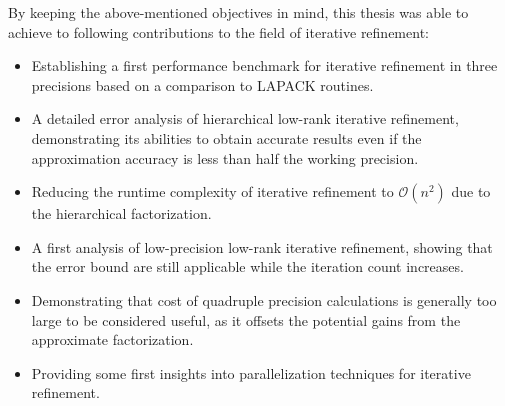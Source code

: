 By keeping the above-mentioned objectives in mind, this thesis was able to achieve to following contributions to the field of iterative refinement:
\begin{itemize}
    \item Establishing a first performance benchmark for iterative refinement in three precisions based on a comparison to LAPACK routines.
    \item A detailed error analysis of hierarchical low-rank iterative refinement, demonstrating its abilities to obtain accurate results even if the approximation accuracy is less than half the working precision.
    \item Reducing the runtime complexity of iterative refinement to $\mathcal{O}(n^2)$ due to the hierarchical factorization.
    \item A first analysis of low-precision low-rank iterative refinement, showing that the error bound are still applicable while the iteration count increases.
    \item Demonstrating that cost of quadruple precision calculations is generally too large to be considered useful, as it offsets the potential gains from the approximate factorization.
    \item Providing some first insights into parallelization techniques for iterative refinement.
\end{itemize}

